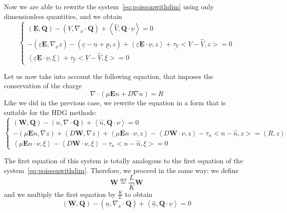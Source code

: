 \documentclass[a4paper,12pt, draft]{article}
\newcommand{\Def}{\stackrel{\mathrm{def}}{=}}
\newcommand{\efield}{\ensuremath{\mathbf{E}}}
\newcommand{\displ}{\ensuremath{\mathbf{W}}}
\newcommand{\qtest}{\ensuremath{\mathbf{Q}}}
\newcommand{\ttest}{\ensuremath{\xi}}
\newcommand{\cmagn}{\ensuremath{K}}
\newcommand{\adim}[1]{\ensuremath{\underline{#1}}}
\begin{document}
Now we are able to rewrite the system~\ref{eq:poissonwithdim} using only dimensionless quantities, 
and we obtain
\[ \label{eq:poissonadim}
  \begin{cases}
  \left(\adim{\efield}, \qtest \right) - \left(\adim{V},\nabla_{\adim{x}} \cdot \qtest\right) +
    \left<\adim{\widehat{V}}, \qtest \cdot \adim{\nu} \right>     = 0 \\
  - \left(\adim{\varepsilon} \adim{\efield}, \nabla_{\adim{x}} z\right)
    - \left(\adim{c} - \adim{n} + \adim{p}, z\right)
    + \left<\adim{\varepsilon} \adim{\efield} \cdot \adim{\nu}, z\right>
    + \adim{\tau_{V}} \big<\adim{V} - \adim{\widehat{V}}, z \big> = 0 \\
  \left<\adim{\varepsilon} \adim{\efield} \cdot \adim{\nu}, \ttest \right>
    + \adim{\tau_{V}} \big<\adim{V} - \adim{\widehat{V}}, \ttest \big> =0
 \end{cases}
\]

Let us now take into account the following equation, that imposes the conservation of the charge
\[ \nabla \cdot \left( \mu \efield n + D \nabla n \right) = R \]
Like we did in the previous case, we rewrite the equation in a form that is suitable for the HDG 
methods:
\begin{equation} \label{eq:chargeconswithdim}
 \begin{cases}
  \left(\displ, \qtest \right) - \left(n,\nabla \cdot \qtest\right) +
    \left<\widehat{n}, \qtest \cdot \nu \right> = 0 \\
  - \! \left(\mu \efield n,\! \nabla z\right) \! + \! \left(D \displ, \nabla z \right)
    \! + \! \left<\mu \efield n \! \cdot \! \nu, z\right>
    \! - \! \left<D \displ \! \cdot \! \nu, z \right> 
    \! - \! \tau_{n} \big<n \! - \! \widehat{n}, z \big> \! = \! (R, z) \\
  \left<\mu \efield n \cdot \nu, \ttest \right> - \left<D \displ \cdot \nu, \ttest \right> 
    - \tau_{n} \big<n - \widehat{n}, \ttest \big> = 0
 \end{cases}
\end{equation}

The first equation of this system is totally analogous to the first equation of the
system~\ref{eq:poissonwithdim}. Therefore, we proceed in the same way: we define
\[ \adim{\displ} \Def \frac{L}{\cmagn}\displ \]
and we multiply the first equation by $\frac{\cmagn}{L}$ to obtain
\[
  \left(\adim{\displ}, \qtest \right) - \left(\adim{n},\nabla_{\adim{x}} \cdot \qtest\right) +
    \left<\adim{\widehat{n}}, \qtest \cdot \adim{\nu} \right> = 0
\]
\end{document}
